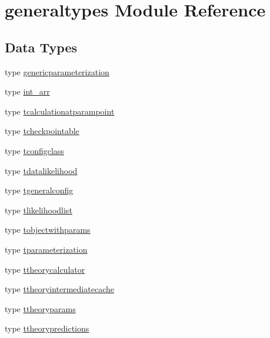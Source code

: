 \hypertarget{namespacegeneraltypes}{}\section{generaltypes Module Reference}
\label{namespacegeneraltypes}
\subsection*{Data Types}
\begin{DoxyCompactItemize}
\item 
type \mbox{\hyperlink{structgeneraltypes_1_1genericparameterization}{genericparameterization}}
\item 
type \mbox{\hyperlink{structgeneraltypes_1_1int__arr}{int\+\_\+arr}}
\item 
type \mbox{\hyperlink{structgeneraltypes_1_1tcalculationatparampoint}{tcalculationatparampoint}}
\item 
type \mbox{\hyperlink{structgeneraltypes_1_1tcheckpointable}{tcheckpointable}}
\item 
type \mbox{\hyperlink{structgeneraltypes_1_1tconfigclass}{tconfigclass}}
\item 
type \mbox{\hyperlink{structgeneraltypes_1_1tdatalikelihood}{tdatalikelihood}}
\item 
type \mbox{\hyperlink{structgeneraltypes_1_1tgeneralconfig}{tgeneralconfig}}
\item 
type \mbox{\hyperlink{structgeneraltypes_1_1tlikelihoodlist}{tlikelihoodlist}}
\item 
type \mbox{\hyperlink{structgeneraltypes_1_1tobjectwithparams}{tobjectwithparams}}
\item 
type \mbox{\hyperlink{structgeneraltypes_1_1tparameterization}{tparameterization}}
\item 
type \mbox{\hyperlink{structgeneraltypes_1_1ttheorycalculator}{ttheorycalculator}}
\item 
type \mbox{\hyperlink{structgeneraltypes_1_1ttheoryintermediatecache}{ttheoryintermediatecache}}
\item 
type \mbox{\hyperlink{structgeneraltypes_1_1ttheoryparams}{ttheoryparams}}
\item 
type \mbox{\hyperlink{structgeneraltypes_1_1ttheorypredictions}{ttheorypredictions}}
\end{DoxyCompactItemize}
